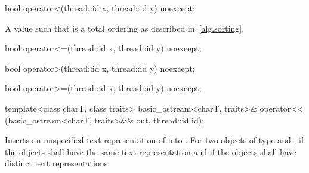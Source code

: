%
%
\begin{itemdecl}
bool operator<(thread::id x, thread::id y) noexcept;
\end{itemdecl}

\begin{itemdescr}
\pnum
\returns A value such that  is a total ordering as described in~\ref{alg.sorting}.
\end{itemdescr}

%
%
\begin{itemdecl}
bool operator<=(thread::id x, thread::id y) noexcept;
\end{itemdecl}

\begin{itemdescr}
\pnum
\returns {}
\end{itemdescr}

%
%
\begin{itemdecl}
bool operator>(thread::id x, thread::id y) noexcept;
\end{itemdecl}

\begin{itemdescr}
\pnum\returns {}
\end{itemdescr}

%
%
\begin{itemdecl}
bool operator>=(thread::id x, thread::id y) noexcept;
\end{itemdecl}

\begin{itemdescr}
\pnum\returns {}
\end{itemdescr}

%
%
\begin{itemdecl}
template<class charT, class traits>
  basic_ostream<charT, traits>&
    operator<< (basic_ostream<charT, traits>&& out, thread::id id);
\end{itemdecl}

\begin{itemdescr}
\pnum\effects Inserts an unspecified text representation of  into
. For two objects of type   and ,
if  the  objects shall have the same text
representation and if  the  objects shall have
distinct text representations.

\pnum\returns {}
\end{itemdescr}

